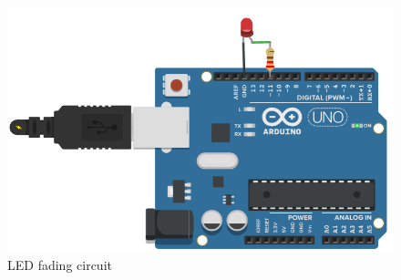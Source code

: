     \begin{figure}
        \centering
        \includegraphics{Images/Programing_Arduino/fading_ckt.png}
        \caption{LED fading circuit}
    \end{figure}














